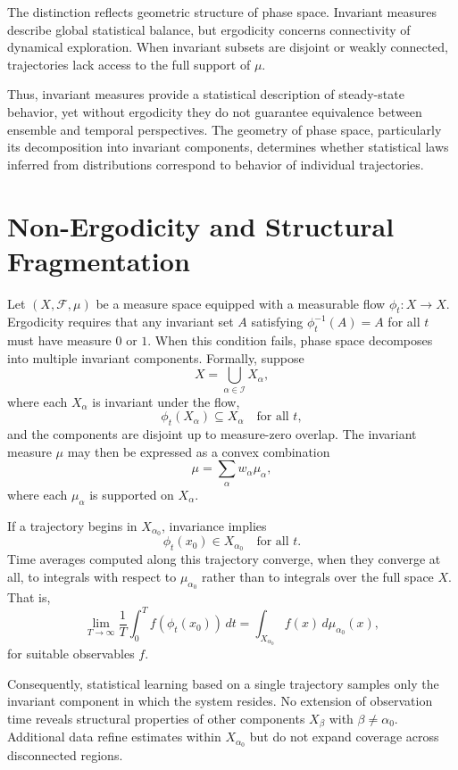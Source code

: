\documentclass[12pt]{book}
\begin{document}
The distinction reflects geometric structure of phase space. Invariant measures describe global statistical balance, but ergodicity concerns connectivity of dynamical exploration. When invariant subsets are disjoint or weakly connected, trajectories lack access to the full support of $\mu$.

Thus, invariant measures provide a statistical description of steady-state behavior, yet without ergodicity they do not guarantee equivalence between ensemble and temporal perspectives. The geometry of phase space, particularly its decomposition into invariant components, determines whether statistical laws inferred from distributions correspond to behavior of individual trajectories.

\section{Non-Ergodicity and Structural Fragmentation}

Let $(X,\mathcal{F},\mu)$ be a measure space equipped with a measurable flow $\phi_t : X \to X$. Ergodicity requires that any invariant set $A$ satisfying $\phi_t^{-1}(A)=A$ for all $t$ must have measure $0$ or $1$. When this condition fails, phase space decomposes into multiple invariant components. Formally, suppose
\[
X = \bigcup_{\alpha \in \mathcal{I}} X_\alpha,
\]
where each $X_\alpha$ is invariant under the flow,
\[
\phi_t(X_\alpha) \subseteq X_\alpha
\quad \text{for all } t,
\]
and the components are disjoint up to measure-zero overlap. The invariant measure $\mu$ may then be expressed as a convex combination
\[
\mu = \sum_{\alpha} w_\alpha \mu_\alpha,
\]
where each $\mu_\alpha$ is supported on $X_\alpha$.

If a trajectory begins in $X_{\alpha_0}$, invariance implies
\[
\phi_t(x_0) \in X_{\alpha_0}
\quad \text{for all } t.
\]
Time averages computed along this trajectory converge, when they converge at all, to integrals with respect to $\mu_{\alpha_0}$ rather than to integrals over the full space $X$. That is,
\[
\lim_{T\to\infty}
\frac{1}{T}
\int_0^T f(\phi_t(x_0))\, dt
=
\int_{X_{\alpha_0}} f(x)\, d\mu_{\alpha_0}(x),
\]
for suitable observables $f$.

Consequently, statistical learning based on a single trajectory samples only the invariant component in which the system resides. No extension of observation time reveals structural properties of other components $X_\beta$ with $\beta \ne \alpha_0$. Additional data refine estimates within $X_{\alpha_0}$ but do not expand coverage across disconnected regions.
\end{document}
